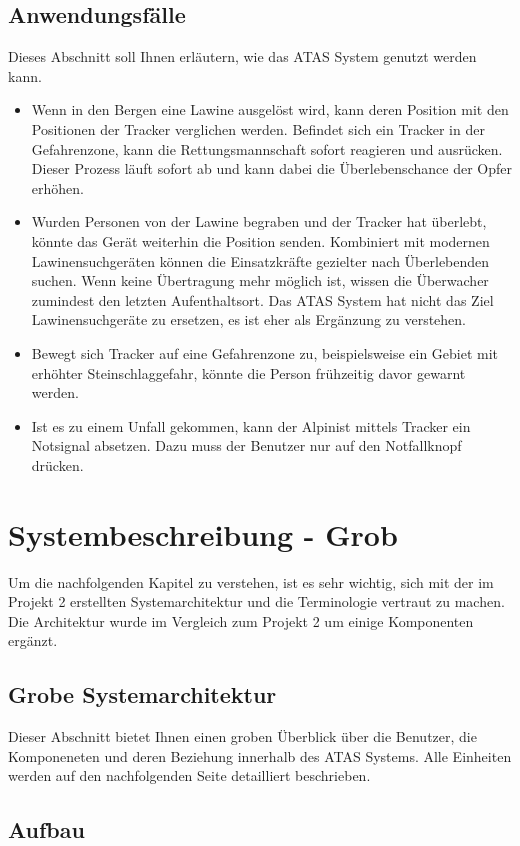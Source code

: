 \documentclass[11pt,english,german]{report}
\theoremstyle{definition}
\begin{document}
\section{Anwendungsfälle}
Dieses Abschnitt soll Ihnen erläutern, wie das ATAS System genutzt werden kann.
\begin{itemize}
	\item 
	Wenn in den Bergen eine Lawine ausgelöst wird, kann deren Position mit den Positionen der Tracker verglichen werden. Befindet sich ein Tracker in der Gefahrenzone, kann die Rettungsmannschaft sofort reagieren und ausrücken. Dieser Prozess läuft sofort ab und kann dabei die Überlebenschance der Opfer erhöhen. 
	\item 
	Wurden Personen von der Lawine begraben und der Tracker hat überlebt, könnte das Gerät weiterhin die Position senden. Kombiniert mit modernen Lawinensuchgeräten können die Einsatzkräfte gezielter nach Überlebenden suchen. Wenn keine Übertragung mehr möglich ist, wissen die Überwacher zumindest den letzten Aufenthaltsort. Das ATAS System hat nicht das Ziel Lawinensuchgeräte zu ersetzen, es ist eher als Ergänzung zu verstehen. 
	\item 
	Bewegt sich Tracker auf eine Gefahrenzone zu, beispielsweise ein Gebiet mit erhöhter Steinschlaggefahr, könnte die Person frühzeitig davor gewarnt werden. 
	\item 
	Ist es zu einem Unfall gekommen, kann der Alpinist mittels Tracker ein Notsignal absetzen. Dazu muss der Benutzer nur auf den Notfallknopf drücken.
\end{itemize}

\chapter{Systembeschreibung - Grob}
Um die nachfolgenden Kapitel zu verstehen, ist es sehr wichtig, sich mit der im Projekt 2 erstellten Systemarchitektur und die Terminologie vertraut zu machen. Die Architektur wurde im Vergleich zum Projekt 2 um einige Komponenten ergänzt.

\section{Grobe Systemarchitektur}
Dieser Abschnitt bietet Ihnen einen groben Überblick über die Benutzer, die Komponeneten und deren Beziehung innerhalb des ATAS Systems. Alle Einheiten werden auf den nachfolgenden Seite detailliert beschrieben.

\newpage
\section{Aufbau}
\end{document}
